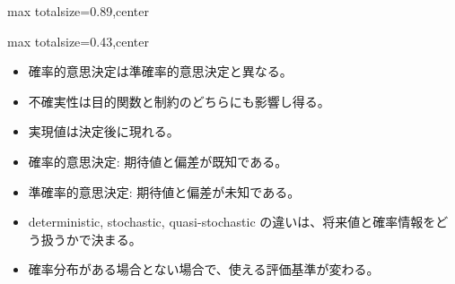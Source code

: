 \begin{minipage}[t]{0.58\textwidth}
\begin{adjustbox}{max totalsize={\textwidth}{0.89\textheight},center}
\begin{minipage}{\textwidth}
\end{minipage}
\end{adjustbox}
\end{minipage}


\clearpage
{}
\begin{minipage}[t]{0.405\textwidth}
\begin{adjustbox}{max totalsize={\textwidth}{0.43\textheight},center}
\begin{minipage}{\textwidth}\scriptsize
{}\begin{itemize}
\item 確率的意思決定は準確率的意思決定と異なる。
\item 不確実性は目的関数と制約のどちらにも影響し得る。
\item 実現値は決定後に現れる。
\item 確率的意思決定: 期待値と偏差が既知である。
\item 準確率的意思決定: 期待値と偏差が未知である。
\end{itemize}\begin{itemize}
\item deterministic, stochastic, quasi-stochastic の違いは、将来値と確率情報をどう扱うかで決まる。
\item 確率分布がある場合とない場合で、使える評価基準が変わる。
\end{itemize}
\end{minipage}
\end{adjustbox}
\end{minipage}\hfill

